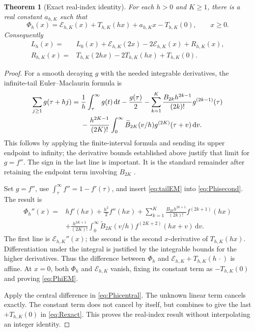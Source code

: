 \documentclass[11pt,a4paper]{article}
\numberwithin{equation}{section}
\newtheorem{theorem}{Theorem}[section]
\theoremstyle{definition}
\newcommand{\dd}{\,\mathrm d}
\newcommand{\bB}{\widetilde B}
\begin{document}
\begin{theorem}[Exact real-index identity]
\label{thm:exactEM}
For each $h>0$ and $K\ge1$, there is a real constant $a_{h,K}$ such that
\begin{equation}
\Phi_h(x)=\mathcal E_{h,K}(x)+T_{h,K}(hx)
                     +a_{h,K}x-T_{h,K}(0),\qquad x\ge0.
\label{eq:PhiEM}
\end{equation}
Consequently
\begin{align}
L_h(x)={}&L_0(x)+\mathcal E_{h,K}(2x)-2\mathcal E_{h,K}(x)
                     +R_{h,K}(x),\label{eq:centralEM}\\
R_{h,K}(x)={}&T_{h,K}(2hx)-2T_{h,K}(hx)+T_{h,K}(0).
\label{eq:Rexact}
\end{align}
\end{theorem}
\begin{proof}
For a smooth decaying $g$ with the needed integrable derivatives, the infinite-tail Euler--Maclaurin formula is
\begin{align}
\sum_{j\ge1}g(\tau+hj)
={}&\frac1h\int_\tau^\infty g(t)\dd t-\frac{g(\tau)}2
 -\sum_{k=1}^K\frac{B_{2k}h^{2k-1}}{(2k)!}g^{(2k-1)}(\tau)\notag\\
&-\frac{h^{2K-1}}{(2K)!}\int_0^\infty
           \bB_{2K}(v/h)g^{(2K)}(\tau+v)\dd v.
\label{eq:tailEM}
\end{align}
This follows by applying the finite-interval formula and sending its upper endpoint to infinity; the derivative bounds established above justify that limit for $g=f''$. The sign in the last line is important. It is the standard remainder after retaining the endpoint term involving $B_{2K}$ \cite{dlmfem}.

Set $g=f''$, use $\int_\tau^\infty f''=1-f'(\tau)$, and insert \eqref{eq:tailEM} into \eqref{eq:Phisecond}. The result is
\begin{align*}
\Phi_h''(x)
={}&h f'(hx)+\frac{h^2}2 f''(hx)
 +\sum_{k=1}^K\frac{B_{2k}h^{2k+1}}{(2k)!}f^{(2k+1)}(hx)\\
&+\frac{h^{2K+1}}{(2K)!}\int_0^\infty
          \bB_{2K}(v/h)f^{(2K+2)}(hx+v)\dd v.
\end{align*}
The first line is $\mathcal E_{h,K}''(x)$; the second is the second $x$-derivative of $T_{h,K}(hx)$. Differentiation under the integral is justified by the integrable bounds for the higher derivatives. Thus the difference between $\Phi_h$ and $\mathcal E_{h,K}+T_{h,K}(h\,\cdot)$ is affine. At $x=0$, both $\Phi_h$ and $\mathcal E_{h,K}$ vanish, fixing its constant term as $-T_{h,K}(0)$ and proving \eqref{eq:PhiEM}.

Apply the central difference in \eqref{eq:Phicentral}. The unknown linear term cancels exactly. The constant term does not cancel by itself, but combines to give the last $+T_{h,K}(0)$ in \eqref{eq:Rexact}. This proves the real-index result without interpolating an integer identity.
\end{proof}
\end{document}
